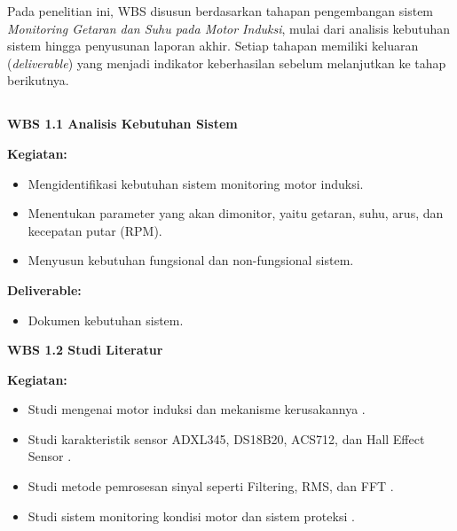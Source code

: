 \documentclass{elsinta}
\begin{document}
Pada penelitian ini, WBS disusun berdasarkan tahapan pengembangan sistem \textit{Monitoring Getaran dan Suhu pada Motor Induksi}, mulai dari analisis kebutuhan sistem hingga penyusunan laporan akhir. Setiap tahapan memiliki keluaran (\textit{deliverable}) yang menjadi indikator keberhasilan sebelum melanjutkan ke tahap berikutnya.

\subsection{\WBSTitle}

\textbf{WBS 1.1 Analisis Kebutuhan Sistem}

\textbf{Kegiatan:}
\begin{itemize}
    \item Mengidentifikasi kebutuhan sistem monitoring motor induksi.
    \item Menentukan parameter yang akan dimonitor, yaitu getaran, suhu, arus, dan kecepatan putar (RPM).
    \item Menyusun kebutuhan fungsional dan non-fungsional sistem.
\end{itemize}

\textbf{Deliverable:}
\begin{itemize}
    \item Dokumen kebutuhan sistem.
\end{itemize}

\textbf{WBS 1.2 Studi Literatur}

\textbf{Kegiatan:}
\begin{itemize}
    \item Studi mengenai motor induksi dan mekanisme kerusakannya \cite{nandi2005}.
    \item Studi karakteristik sensor ADXL345, DS18B20, ACS712, dan Hall Effect Sensor \cite{ADXL345,ACS712,A3144}.
    \item Studi metode pemrosesan sinyal seperti Filtering, RMS, dan FFT \cite{oppenheim2010,randall2011}.
    \item Studi sistem monitoring kondisi motor dan sistem proteksi \cite{jardine2006}.
\end{itemize}
\end{document}
